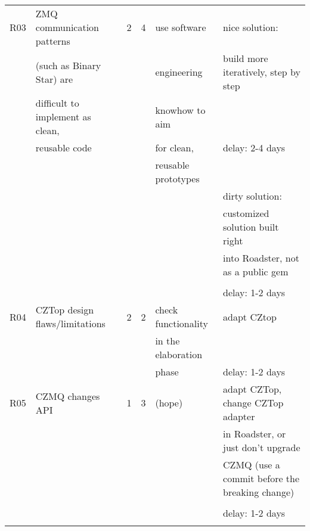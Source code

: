 \begin{center}
\begin{longtable}{|p{6mm}|p{30mm}|p{6mm}|p{8mm}|p{30mm}|p{64mm}|}
	R03 & ZMQ communication patterns		& \cellcolor{yellow!50}2 	& \cellcolor{yellow!50}4 	& use software 		& nice solution: 						\\
		& (such as Binary Star) are 		& \cellcolor{yellow!50} 	& \cellcolor{yellow!50}		& engineering 		& build more iteratively, step by step 	\\
		& difficult to implement as clean, 	& \cellcolor{yellow!50} 	& \cellcolor{yellow!50}		& knowhow to aim 	& 										\\
		& reusable code						& \cellcolor{yellow!50} 	& \cellcolor{yellow!50}		& for clean, 		& delay: 2-4 days						\\ 
		&									& \cellcolor{yellow!50} 	& \cellcolor{yellow!50}		& reusable prototypes & 										\\
		&									& \cellcolor{yellow!50} 	& \cellcolor{yellow!50}		&					& dirty solution: 						\\
		&									& \cellcolor{yellow!50} 	& \cellcolor{yellow!50}		&					& customized solution built right		\\
		&									& \cellcolor{yellow!50} 	& \cellcolor{yellow!50}		&					& into Roadster, not as a public gem	\\
		&									& \cellcolor{yellow!50} 	& \cellcolor{yellow!50}		&					& 										\\
		&									& \cellcolor{yellow!50} 	& \cellcolor{yellow!50}		&					& delay: 1-2 days 						\\ \hline
		
	R04	& CZTop design flaws/limitations 	& \cellcolor{yellow!50}2	& \cellcolor{yellow!50}2 	& check functionality & adapt CZtop							\\
		&									& \cellcolor{yellow!50}		& \cellcolor{yellow!50}		& in the elaboration &										\\
		&									& \cellcolor{yellow!50}		& \cellcolor{yellow!50}		& phase				& delay: 1-2 days						\\ \hline
		
	R05 & CZMQ changes API  				& \cellcolor{yellow!50}1 	& \cellcolor{yellow!50}3 	& (hope) 			& adapt CZTop, change CZTop adapter 	\\
		&					  				& \cellcolor{yellow!50} 	& \cellcolor{yellow!50} 	& 		 			& in Roadster, or just don't upgrade	\\
		&					  				& \cellcolor{yellow!50} 	& \cellcolor{yellow!50} 	& 		 			& CZMQ (use a commit before the breaking change)	\\
		&					  				& \cellcolor{yellow!50} 	& \cellcolor{yellow!50} 	& 		 			& 													\\
		&					  				& \cellcolor{yellow!50} 	& \cellcolor{yellow!50} 	& 		 			& delay: 1-2 days 									\\ \hline	\\
		

\end{longtable}
\end{center}
